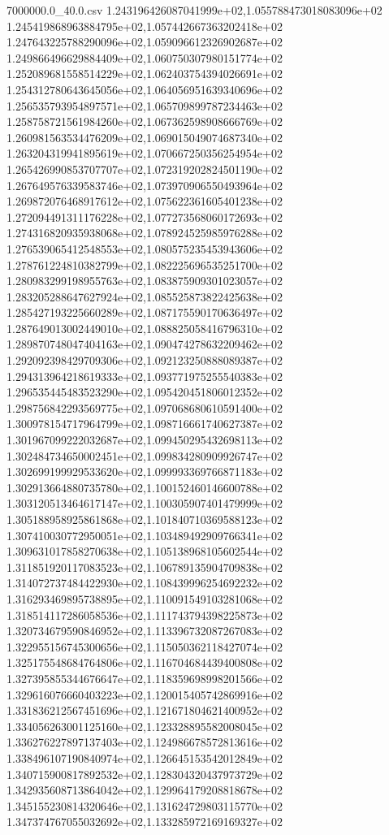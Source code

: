 \begin{filecontents*}{7000000.0_40.0.csv}
1.243196426087041999e+02,1.055788473018083096e+02
1.245419868963884795e+02,1.057442667363202418e+02
1.247643225788290096e+02,1.059096612326902687e+02
1.249866496629884409e+02,1.060750307980151774e+02
1.252089681558514229e+02,1.062403754394026691e+02
1.254312780643645056e+02,1.064056951639340696e+02
1.256535793954897571e+02,1.065709899787234463e+02
1.258758721561984260e+02,1.067362598908666769e+02
1.260981563534476209e+02,1.069015049074687340e+02
1.263204319941895619e+02,1.070667250356254954e+02
1.265426990853707707e+02,1.072319202824501190e+02
1.267649576339583746e+02,1.073970906550493964e+02
1.269872076468917612e+02,1.075622361605401238e+02
1.272094491311176228e+02,1.077273568060172693e+02
1.274316820935938068e+02,1.078924525985976288e+02
1.276539065412548553e+02,1.080575235453943606e+02
1.278761224810382799e+02,1.082225696535251700e+02
1.280983299198955763e+02,1.083875909301023057e+02
1.283205288647627924e+02,1.085525873822425638e+02
1.285427193225660289e+02,1.087175590170636497e+02
1.287649013002449010e+02,1.088825058416796310e+02
1.289870748047404163e+02,1.090474278632209462e+02
1.292092398429709306e+02,1.092123250888089387e+02
1.294313964218619333e+02,1.093771975255540383e+02
1.296535445483523290e+02,1.095420451806012352e+02
1.298756842293569775e+02,1.097068680610591400e+02
1.300978154717964799e+02,1.098716661740627387e+02
1.301967099222032687e+02,1.099450295432698113e+02
1.302484734650002451e+02,1.099834280909926747e+02
1.302699199929533620e+02,1.099993369766871183e+02
1.302913664880735780e+02,1.100152460146600788e+02
1.303120513464617147e+02,1.100305907401479999e+02
1.305188958925861868e+02,1.101840710369588123e+02
1.307410030772950051e+02,1.103489492909766341e+02
1.309631017858270638e+02,1.105138968105602544e+02
1.311851920117083523e+02,1.106789135904709838e+02
1.314072737484422930e+02,1.108439996254692232e+02
1.316293469895738895e+02,1.110091549103281068e+02
1.318514117286058536e+02,1.111743794398225873e+02
1.320734679590846952e+02,1.113396732087267083e+02
1.322955156745300656e+02,1.115050362118427074e+02
1.325175548684764806e+02,1.116704684439400808e+02
1.327395855344676647e+02,1.118359698998201566e+02
1.329616076660403223e+02,1.120015405742869916e+02
1.331836212567451696e+02,1.121671804621400952e+02
1.334056263001125160e+02,1.123328895582008045e+02
1.336276227897137403e+02,1.124986678572813616e+02
1.338496107190840974e+02,1.126645153542012849e+02
1.340715900817892532e+02,1.128304320437973729e+02
1.342935608713864042e+02,1.129964179208818678e+02
1.345155230814320646e+02,1.131624729803115770e+02
1.347374767055032692e+02,1.133285972169169327e+02

\end{filecontents*}
